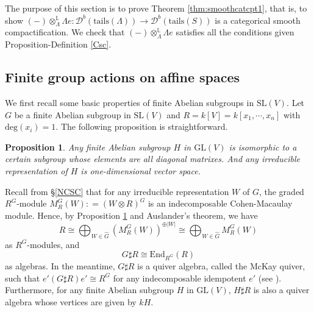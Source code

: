 \documentclass[11pt,reqno]{amsart}
\newtheorem{proposition}[theorem]{Proposition}
\theoremstyle{definition}
\begin{document}
The purpose of this section is to prove Theorem
\ref{thm:smoothcatcpt1}, that is, to show
$
 (-) \otimes^{\mathbb{L}}_{\Lambda} \Lambda
 e : \mathcal{D}^{b}(\mathrm{tails}
 (\Lambda)) 
\rightarrow \mathcal{D}^{b}(\mathrm{tails}
(S))
$
is a categorical smooth compactification. We check that 
$ (-) \otimes^{\mathbb{L}}_{\Lambda} \Lambda e $
satisfies all the conditions given 
Proposition-Definition \ref{Csc}.


\subsection{Finite group actions on affine spaces}\label{fgas}

We first recall some basic properties of finite Abelian  subgroups in $\mathrm{SL}(V)$.
Let $G$ be a finite Abelian subgroup in $\mathrm{SL}(V)$ and $R = k[V] = k[x_1, \cdots, x_n]$ 
with $\mathrm{deg}(x_i) = 1$. 
The following proposition is straightforward. 

\begin{proposition}\label{CanAb}	
Any finite Abelian  subgroup $H$ in $\mathrm{GL}(V)$
is isomorphic to a certain subgroup 
whose elements are all diagonal matrixes.
And any irreducible representation of $H$ is one-dimensional vector space. 		
\end{proposition}

Recall from \S\ref{NCSC} that
for any irreducible representation $W$ of $G$, the graded $R^{G}$-module
$M^{G}_R(W): = (W \otimes R)^G$ is an indecomposable Cohen-Macaulay module. 
Hence, by Proposition \ref{CanAb} and Auslander's theorem, we have
$$
R \cong \bigoplus_{W \in \hat{G}} (M^{G}_R(W))^{\oplus |W|} 
\cong \bigoplus_{W \in \hat{G}} M^{G}_R(W)
$$
 as $R^G$-modules, and
$$
G \sharp R \cong \mathrm{End}_{R^{G}}(R)
$$
as algebras. 
In the meantime, $G \sharp R$ is a quiver algebra, called the McKay quiver,  
such that $e'(G \sharp R)e' \cong R^G$ 
for any indecomposable idempotent $e'$ (see \cite[2.2.1]{BFC}). 
Furthermore, for any finite Abelian subgroup $H$ in $\mathrm{GL}(V)$, $H \sharp R$ is also a
quiver algebra whose vertices are given by $kH$.  



\iffalse
\end{document}
